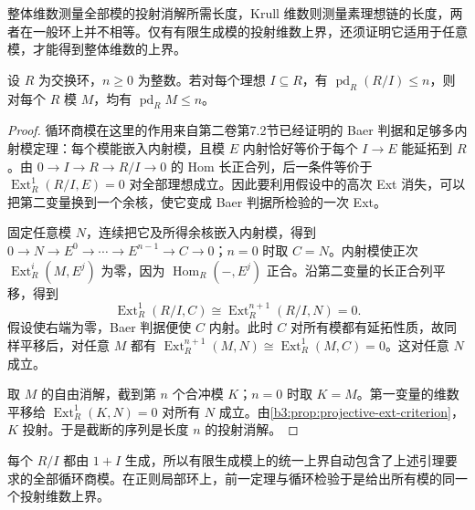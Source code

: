 整体维数测量全部模的投射消解所需长度，Krull 维数则测量素理想链的长度，两者在一般环上并不相等。仅有有限生成模的投射维数上界，还须证明它适用于任意模，才能得到整体维数的上界。

\begin{lemma}\label{b3:lem:cyclic-global-dimension-test}
	设 \(R\) 为交换环，\(n\ge0\) 为整数。若对每个理想 \(I\subseteq R\)，有 \(\operatorname{pd}_R(R/I)\le n\)，则对每个 \(R\) 模 \(M\)，均有 \(\operatorname{pd}_RM\le n\)。
\end{lemma}
\begin{proof}
	循环商模在这里的作用来自第二卷第7.2节已经证明的 Baer 判据和足够多内射模定理：每个模能嵌入内射模，且模 \(E\) 内射恰好等价于每个 \(I\to E\) 能延拓到 \(R\)。由 \(0\to I\to R\to R/I\to0\) 的 Hom 长正合列，后一条件等价于 \(\operatorname{Ext}_R^1(R/I,E)=0\) 对全部理想成立。因此要利用假设中的高次 Ext 消失，可以把第二变量换到一个余核，使它变成 Baer 判据所检验的一次 Ext。

	固定任意模 \(N\)，连续把它及所得余核嵌入内射模，得到 \(0\to N\to E^0\to\cdots\to E^{n-1}\to C\to0\)；\(n=0\) 时取 \(C=N\)。内射模使正次 \(\operatorname{Ext}_R^i(M,E^j)\) 为零，因为 \(\operatorname{Hom}_R(-,E^j)\) 正合。沿第二变量的长正合列平移，得到
	\[
		\operatorname{Ext}_R^1(R/I,C) \cong\operatorname{Ext}_R^{n+1}(R/I,N)=0.
	\]
	假设使右端为零，Baer 判据便使 \(C\) 内射。此时 \(C\) 对所有模都有延拓性质，故同样平移后，对任意 \(M\) 都有 \(\operatorname{Ext}_R^{n+1}(M,N)\cong\operatorname{Ext}_R^1(M,C)=0\)。这对任意 \(N\) 成立。

	取 \(M\) 的自由消解，截到第 \(n\) 个合冲模 \(K\)；\(n=0\) 时取 \(K=M\)。第一变量的维数平移给 \(\operatorname{Ext}_R^1(K,N)=0\) 对所有 \(N\) 成立。由\cref{b3:prop:projective-ext-criterion}，\(K\) 投射。于是截断的序列是长度 \(n\) 的投射消解。
\end{proof}

每个 \(R/I\) 都由 \(1+I\) 生成，所以有限生成模上的统一上界自动包含了上述引理要求的全部循环商模。在正则局部环上，前一定理与循环检验于是给出所有模的同一个投射维数上界。

